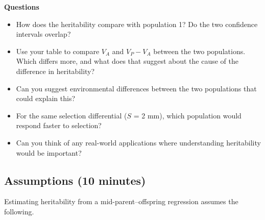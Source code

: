 \documentclass[
  a4paper]{book}
\providecommand{\tightlist}{%
  \setlength{\itemsep}{0pt}\setlength{\parskip}{0pt}}
\begin{document}
\textbf{Questions}

\begin{itemize}
\tightlist
\item
  How does the heritability compare with population 1? Do the two confidence intervals overlap?
\item
  Use your table to compare \(V_A\) and \(V_P - V_A\) between the two populations. Which differs more, and what does that suggest about the cause of the difference in heritability?
\item
  Can you suggest environmental differences between the two populations that could explain this?
\item
  For the same selection differential (\(S\) = 2 mm), which population would respond faster to selection?
\item
  Can you think of any real-world applications where understanding heritability would be important?
\end{itemize}

\subsection{Assumptions (10 minutes)}\label{assumptions-10-minutes}

Estimating heritability from a mid-parent--offspring regression assumes the following.
\end{document}
